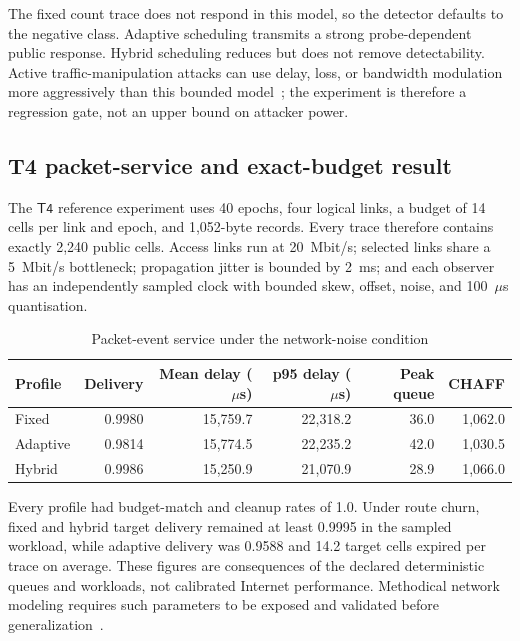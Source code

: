 \documentclass[11pt,oneside]{article}
\newcommand{\Tfour}{\ensuremath{\mathsf{T4}}}
\begin{document}
The fixed count trace does not respond in this model, so the detector defaults to the negative class. Adaptive scheduling transmits a strong probe-dependent public response. Hybrid scheduling reduces but does not remove detectability. Active traffic-manipulation attacks can use delay, loss, or bandwidth modulation more aggressively than this bounded model~\cite{dropmark,duster,activeflowmark2026}; the experiment is therefore a regression gate, not an upper bound on attacker power.

\subsection{T4 packet-service and exact-budget result}

The \Tfour{} reference experiment uses 40 epochs, four logical links, a budget of 14 cells per link and epoch, and 1,052-byte records. Every trace therefore contains exactly 2,240 public cells. Access links run at 20~Mbit/s; selected links share a 5~Mbit/s bottleneck; propagation jitter is bounded by 2~ms; and each observer has an independently sampled clock with bounded skew, offset, noise, and 100~$\mu$s quantisation.

\begin{table}[ht]
\centering
\caption{Packet-event service under the network-noise condition}
\label{tab:t4packet}
\begin{tabular}{@{}lrrrrr@{}}
\toprule
Profile & Delivery & Mean delay ($\mu$s) & p95 delay ($\mu$s) & Peak queue & CHAFF \\
\midrule
Fixed & 0.9980 & 15,759.7 & 22,318.2 & 36.0 & 1,062.0 \\
Adaptive & 0.9814 & 15,774.5 & 22,235.2 & 42.0 & 1,030.5 \\
Hybrid & 0.9986 & 15,250.9 & 21,070.9 & 28.9 & 1,066.0 \\
\bottomrule
\end{tabular}
\end{table}

Every profile had budget-match and cleanup rates of 1.0. Under route churn, fixed and hybrid target delivery remained at least 0.9995 in the sampled workload, while adaptive delivery was 0.9588 and 14.2 target cells expired per trace on average. These figures are consequences of the declared deterministic queues and workloads, not calibrated Internet performance. Methodical network modeling requires such parameters to be exposed and validated before generalization~\cite{shadow2012,tormodel2012}.
\end{document}
